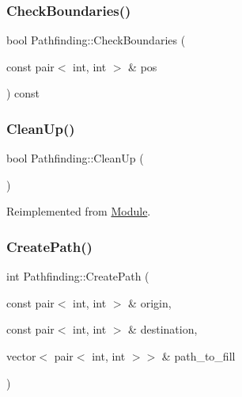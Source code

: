 \mbox{\label{class_pathfinding_a07821f23e40533dead35728d058d8136}} 
\subsubsection{\texorpdfstring{CheckBoundaries()}{CheckBoundaries()}}
{\footnotesize\ttfamily bool Pathfinding\+::\+Check\+Boundaries (\begin{DoxyParamCaption}\item[{const pair$<$ int, int $>$ \&}]{pos }\end{DoxyParamCaption}) const}

\mbox{\label{class_pathfinding_ac377b4477dad76360fdb4c64e52d80f6}} 
\subsubsection{\texorpdfstring{CleanUp()}{CleanUp()}}
{\footnotesize\ttfamily bool Pathfinding\+::\+Clean\+Up (\begin{DoxyParamCaption}{ }\end{DoxyParamCaption})\hspace{0.3cm}{\ttfamily [virtual]}}



Reimplemented from \mbox{\hyperlink{class_module_a77d7a006e42c0bd10110e1adbd4598cb}{Module}}.

\mbox{\label{class_pathfinding_a81f4b825973f68ff3e0c984eee049309}} 
\subsubsection{\texorpdfstring{CreatePath()}{CreatePath()}}
{\footnotesize\ttfamily int Pathfinding\+::\+Create\+Path (\begin{DoxyParamCaption}\item[{const pair$<$ int, int $>$ \&}]{origin,  }\item[{const pair$<$ int, int $>$ \&}]{destination,  }\item[{vector$<$ pair$<$ int, int $>$$>$ \&}]{path\+\_\+to\+\_\+fill }\end{DoxyParamCaption})}

